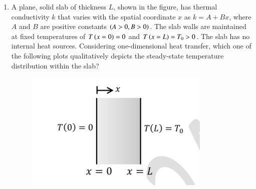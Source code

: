 \documentclass[journal]{IEEEtran}
\begin{document}
\begin{enumerate}[leftmargin=0pt]
\vspace{2mm}

\begin{enumerate}
\end{enumerate}

\hfill{}

\item
A plane, solid slab of thickness $L$, shown in the figure, has thermal conductivity $k$ that varies with the spatial coordinate $x$ as $k = A + Bx$, where $A$ and $B$ are positive constants $\left(A > 0, B > 0\right)$. The slab walls are maintained at fixed temperatures of $T\left(x = 0\right) = 0$ and $T\left(x = L\right) = T_0 > 0$. The slab has no internal heat sources. Considering one-dimensional heat transfer, which one of the following plots qualitatively depicts the steady-state temperature distribution within the slab?

\begin{figure}[h]
\includegraphics[width=0.40\columnwidth]{Figs/image (63).png}
\caption*{}
\label{fig:17}
\end{figure}


\end{enumerate}
\end{document}
